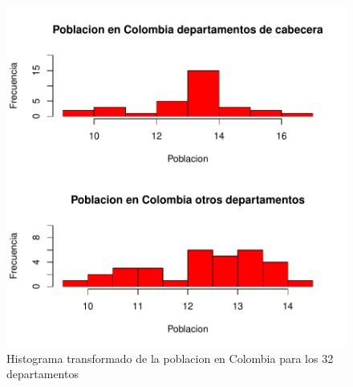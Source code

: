 \begin{figure}[H]
\centering
\includegraphics[width=\textwidth]{univariada-rehacerhistogramas}
\caption{Histograma transformado de la poblacion en Colombia para los 32 departamentos}
\label{barplot4}
\end{figure}
